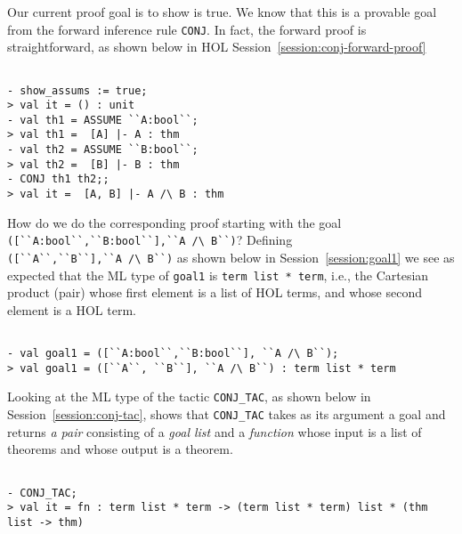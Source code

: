Our current proof goal is to show  is true. We
know that this is a provable goal from the forward inference rule
\texttt{CONJ}. In fact, the forward proof is straightforward, as shown
below in HOL Session~\ref{session:conj-forward-proof}
\begin{session}
\label{session:conj-forward-proof}

  \begin{scriptsize}
\begin{verbatim}

- show_assums := true;
> val it = () : unit
- val th1 = ASSUME ``A:bool``;
> val th1 =  [A] |- A : thm
- val th2 = ASSUME ``B:bool``;
> val th2 =  [B] |- B : thm
- CONJ th1 th2;;
> val it =  [A, B] |- A /\ B : thm
\end{verbatim}
  \end{scriptsize}
\end{session}

How do we do the corresponding proof starting with the goal
\\\verb|([``A:bool``,``B:bool``],``A /\ B``)|?  Defining\\
\verb|([``A``,``B``],``A /\ B``)| as shown below in
Session~\ref{session:goal1} we see as expected that the ML type of
\texttt{goal1} is \texttt{term list * term}, i.e., the Cartesian
product (pair) whose first element is a list of HOL terms, and whose
second element is a HOL term.
\begin{session}
  \label{session:goal1}
  \begin{scriptsize}
\begin{verbatim}

- val goal1 = ([``A:bool``,``B:bool``], ``A /\ B``);
> val goal1 = ([``A``, ``B``], ``A /\ B``) : term list * term
\end{verbatim}
  \end{scriptsize}
\end{session}

Looking at the ML type of the tactic \verb|CONJ_TAC|, as shown below
in Session~\ref{session:conj-tac}, shows that \verb|CONJ_TAC| takes as
its argument a goal and returns \emph{a pair} consisting of a
\emph{goal list} and a \emph{function} whose input is a list of
theorems and whose output is a theorem.
\begin{session}
\label{session:conj-tac}
  \begin{scriptsize}
\begin{verbatim}

- CONJ_TAC;
> val it = fn : term list * term -> (term list * term) list * (thm list -> thm)
\end{verbatim}
  \end{scriptsize}
\end{session}

